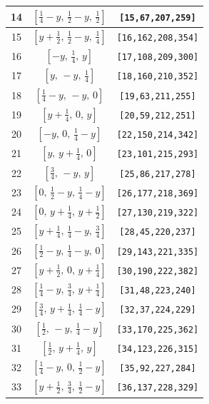 \documentclass[fleqn,8pt]{jsarticle}
\begin{document}
\begin{longtable}{ccc}
14 & $\left[ \frac{1}{4} - y,\, \frac{1}{2} - y,\, \frac{1}{2} \right]$ & {\tt [15,67,207,259]} \\ \hline
15 & $\left[ y + \frac{1}{2},\, \frac{1}{2} - y,\, \frac{1}{4} \right]$ & {\tt [16,162,208,354]} \\ \hline
16 & $\left[ - y,\, \frac{1}{4},\, y \right]$ & {\tt [17,108,209,300]} \\ \hline
17 & $\left[ y,\, - y,\, \frac{1}{4} \right]$ & {\tt [18,160,210,352]} \\ \hline
18 & $\left[ \frac{1}{4} - y,\, - y,\, 0 \right]$ & {\tt [19,63,211,255]} \\ \hline
19 & $\left[ y + \frac{1}{4},\, 0,\, y \right]$ & {\tt [20,59,212,251]} \\ \hline
20 & $\left[ - y,\, 0,\, \frac{1}{4} - y \right]$ & {\tt [22,150,214,342]} \\ \hline
21 & $\left[ y,\, y + \frac{1}{4},\, 0 \right]$ & {\tt [23,101,215,293]} \\ \hline
22 & $\left[ \frac{3}{4},\, - y,\, y \right]$ & {\tt [25,86,217,278]} \\ \hline
23 & $\left[ 0,\, \frac{1}{2} - y,\, \frac{1}{4} - y \right]$ & {\tt [26,177,218,369]} \\ \hline
24 & $\left[ 0,\, y + \frac{1}{4},\, y + \frac{1}{2} \right]$ & {\tt [27,130,219,322]} \\ \hline
25 & $\left[ y + \frac{1}{4},\, \frac{1}{4} - y,\, \frac{3}{4} \right]$ & {\tt [28,45,220,237]} \\ \hline
26 & $\left[ \frac{1}{2} - y,\, \frac{1}{4} - y,\, 0 \right]$ & {\tt [29,143,221,335]} \\ \hline
27 & $\left[ y + \frac{1}{2},\, 0,\, y + \frac{1}{4} \right]$ & {\tt [30,190,222,382]} \\ \hline
28 & $\left[ \frac{1}{4} - y,\, \frac{3}{4},\, y + \frac{1}{4} \right]$ & {\tt [31,48,223,240]} \\ \hline
29 & $\left[ \frac{3}{4},\, y + \frac{1}{4},\, \frac{1}{4} - y \right]$ & {\tt [32,37,224,229]} \\ \hline
30 & $\left[ \frac{1}{2},\, - y,\, \frac{1}{4} - y \right]$ & {\tt [33,170,225,362]} \\ \hline
31 & $\left[ \frac{1}{2},\, y + \frac{1}{4},\, y \right]$ & {\tt [34,123,226,315]} \\ \hline
32 & $\left[ \frac{1}{4} - y,\, 0,\, \frac{1}{2} - y \right]$ & {\tt [35,92,227,284]} \\ \hline
33 & $\left[ y + \frac{1}{2},\, \frac{3}{4},\, \frac{1}{2} - y \right]$ & {\tt [36,137,228,329]} \\ \hline

\end{longtable}
\end{document}
